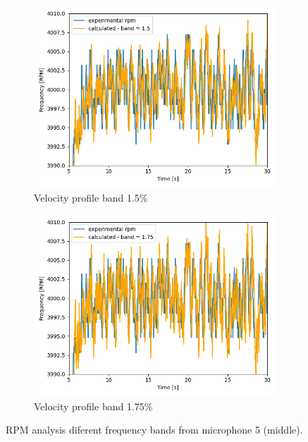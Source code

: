 \documentclass[10pt,fleqn,a4paper,twoside]{article}
\begin{document}
\begin{figure}[H]
        \centering
        \hfill
        \begin{subfigure}{0.4\textwidth}
            \includegraphics[width=\textwidth]{Figures/rpm_analysis_mic4_band_1.5.png}
            \caption{Velocity profile band 1.5\%}
            \label{fig:sixth}
        \end{subfigure}
        \centering
        \hfill
        \begin{subfigure}{0.4\textwidth}
            \includegraphics[width=\textwidth]{Figures/rpm_analysis_mic4_band_1.75.png}
            \caption{Velocity profile band 1.75\%}
            \label{fig:seventh}
        \end{subfigure}   
        \caption{RPM analysis diferent frequency bands from microphone 5 (middle).}
        \label{fig:figures}
        \end{figure}
\end{document}
